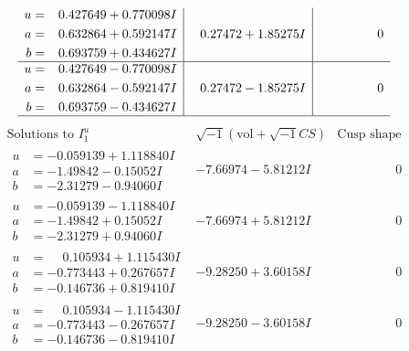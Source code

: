 \documentclass[1p]{elsarticle_modified}
\theoremstyle{definition}
\newcommand{\I}{\sqrt{-1}}
\begin{document}
$$\begin{array}{c|c|c}
\begin{aligned}
u &= \phantom{-}0.427649 + 0.770098 I \\
a &= \phantom{-}0.632864 + 0.592147 I \\
b &= \phantom{-}0.693759 + 0.434627 I\end{aligned}
 & \phantom{-}0.27472 + 1.85275 I & \phantom{-0.000000 } 0 \\ \hline\begin{aligned}
u &= \phantom{-}0.427649 - 0.770098 I \\
a &= \phantom{-}0.632864 - 0.592147 I \\
b &= \phantom{-}0.693759 - 0.434627 I\end{aligned}
 & \phantom{-}0.27472 - 1.85275 I & \phantom{-0.000000 } 0\\
 \hline 
 \end{array}$$\newpage$$\begin{array}{c|c|c}  
\text{Solutions to }I^u_{1}& \I (\text{vol} + \sqrt{-1}CS) & \text{Cusp shape}\\
 \hline 
\begin{aligned}
u &= -0.059139 + 1.118840 I \\
a &= -1.49842 - 0.15052 I \\
b &= -2.31279 - 0.94060 I\end{aligned}
 & -7.66974 - 5.81212 I & \phantom{-0.000000 } 0 \\ \hline\begin{aligned}
u &= -0.059139 - 1.118840 I \\
a &= -1.49842 + 0.15052 I \\
b &= -2.31279 + 0.94060 I\end{aligned}
 & -7.66974 + 5.81212 I & \phantom{-0.000000 } 0 \\ \hline\begin{aligned}
u &= \phantom{-}0.105934 + 1.115430 I \\
a &= -0.773443 + 0.267657 I \\
b &= -0.146736 + 0.819410 I\end{aligned}
 & -9.28250 + 3.60158 I & \phantom{-0.000000 } 0 \\ \hline\begin{aligned}
u &= \phantom{-}0.105934 - 1.115430 I \\
a &= -0.773443 - 0.267657 I \\
b &= -0.146736 - 0.819410 I\end{aligned}
 & -9.28250 - 3.60158 I & \phantom{-0.000000 } 0 \\ \hline\begin{aligned}

\end{aligned}
\end{array}$$
\end{document}

